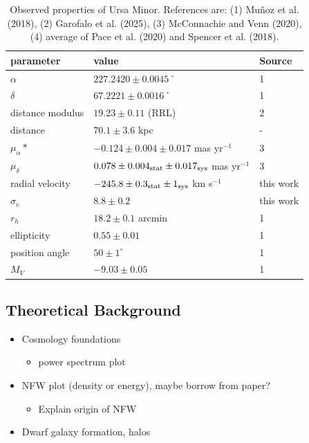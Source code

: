 \begin{table}[t]
\centering
\caption{Observed properties of Ursa Minor. References are: (1) Muñoz et al. (2018), (2) Garofalo et al. (2025), (3) McConnachie and Venn (2020), (4) average of Pace et al. (2020) and Spencer et al. (2018).}
\label{tbl:Observed-properties-of-Ursa-Minor-References-are:-1-Muñoz-et-al-2018-2-Garofalo-et-al-2025-3-McConnachie-and-Venn-2020-4-average-of-Pace-et-al-2020-and-Spencer-et-al-2018}
\begin{tabular}{lll}
\toprule
parameter & value & Source\\
\midrule
$\alpha$ & $ 227.2420 \pm 0.0045$˚ & 1\\
$\delta$ & $67.2221 \pm 0.0016$˚ & 1\\
distance modulus & $19.23 \pm 0.11$ (RRL) & 2\\
distance & $70.1 \pm 3.6$ kpc & -\\
$\mu_\alpha*$ & $-0.124 \pm 0.004 \pm 0.017$ mas yr$^{-1}$ & 3\\
$\mu_\delta$ & $0.078 \pm 0.004_{\rm stat} \pm 0.017_{\rm sys}$ mas yr$^{-1}$ & 3\\
radial velocity & $-245.8 \pm 0.3_{\rm stat} \pm 1_{\rm sys}$ km s$^{-1}$ & this work\\
$\sigma_v$ & $8.8 \pm 0.2$ & this work\\
$r_h$ & $18.2 \pm 0.1$ arcmin & 1\\
ellipticity & $0.55 \pm 0.01$ & 1\\
position angle & $50 \pm 1^\circ$ & 1\\
$M_V$ & $-9.03 \pm 0.05$ & 1\\
\bottomrule
\end{tabular}
\end{table}

\subsection{Theoretical Background}\label{theoretical-background}

\begin{itemize}
\tightlist
\item
  Cosmology foundations

  \begin{itemize}
  \tightlist
  \item
    power spectrum plot
  \end{itemize}
\item
  NFW plot (density or energy), maybe borrow from paper?

  \begin{itemize}
  \tightlist
  \item
    Explain origin of NFW
  \end{itemize}
\item
  Dwarf galaxy formation, halos
\end{itemize}

